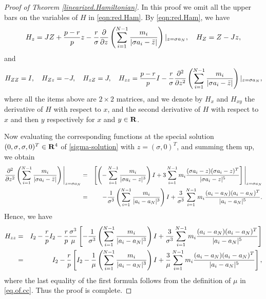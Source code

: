 \documentclass[11pt]{article}
\def\nn{\nonumber}
\def\R{{\bf R}}
\def\sg{{\sigma}}
\begin{document}
\begin{proof}[Proof of Theorem \ref{linearized.Hamiltonian}]
       In this proof we omit all the upper bars on the variables of $H$ in \eqref{eqn:red.Ham}. By \eqref{eqn:red.Ham}, we have
       \begin{align}
        H_z=JZ+\frac{p-r}{p}z
        -\frac{r}{\sigma}{\partial\over\partial z}\left(\sum_{i=1}^{N-1}{m_i\over|\sg a_i-\bar{z}|}\right)|_{z=\sg a_{N}},  \quad H_{Z} =Z-Jz, 
       \end{align}
       and
       \begin{align}
        H_{ZZ}=I,\quad H_{Zz}=-J, \quad H_{zZ}=J, \quad 
        H_{zz}=\frac{p-r}{p}I-\frac{r}{\sigma}{\partial^2\over\partial z^2}\left(\sum_{i=1}^{N-1}{m_i\over|\sg a_i-\bar{z}|}\right)|_{z=\sg a_{N}},
       \end{align}
       where all the items above are $2\times2$ matrices, and we denote by $H_x$ and $H_{xy}$
       the derivative of $H$ with respect to $x$, and the second derivative of $H$ with respect to
       $x$ and then $y$ respectively for $x$ and $y\in\R$.
       
       Now evaluating the corresponding functions at the special solution
       $({0,\sg},{\sg,0})^T\in\R^{4}$
       of \eqref{sigma-solution} with $z=(\sg,0)^T$, and summing them up, we
       obtain
       \begin{eqnarray}
       \frac{\partial^2}{\partial z^2}\left(\sum_{i=1}^{N-1}{m_i\over|\sg a_i-\bar{z}|}\right)\Bigg|_{z=\sigma a_N}
       &=&\left[\left(-\sum_{i=1}^{N-1}{m_i\over|\sigma a_i-z|^3}\right)I
          +3\sum_{i=1}^{N-1} m_i\frac{(\sg a_i-z)(\sg a_i-z)^T}{|\sigma a_i-z|^5}\right]\Bigg|_{z=\sigma a_N}
       \nonumber\\
       &=&-{1\over\sg^3}\left(\sum_{i=1}^{N-1}{m_i\over|a_i-a_{N}|^3}\right)I
       +{3\over\sg^3}\sum_{i=1}^{N-1} m_i\frac{(a_i-a_{N})(a_i-a_{N})^T}{|a_i-a_{N}|^5}.
       \label{U_zz}
       \end{eqnarray}
       Hence, we have
       \begin{eqnarray}
       H_{zz}&=&I_2-{r\over p}I_2-{r\over p}{\sg^3\over\mu}
                  \left[-{1\over\sg^3}\left(\sum_{i=1}^{N-1}{m_i\over|a_i-a_{N}|^3}\right)I
                  +{3\over\sg^3}\sum_{i=1}^{N-1} m_i\frac{(a_i-a_{N})(a_i-a_{N})^T}{|a_i-a_{N}|^5}\right]
                  \nn\\
             &=&I_2-{r\over p}\left[I_2-{1\over\mu}\left(\sum_{i=1}^{N-1}{m_i\over|a_i-a_{N}|^3}\right)I
             +{3\over\mu}\sum_{i=1}^{N-1} m_i\frac{(a_i-a_{N})(a_i-a_{N})^T}{|a_i-a_{N}|^5}\right],
       \end{eqnarray}
       where the last equality of the first formula follows from the definition of $\mu$ in \eqref{eq.of.cc}.
       Thus the proof is complete. 
\end{proof}
\end{document}
